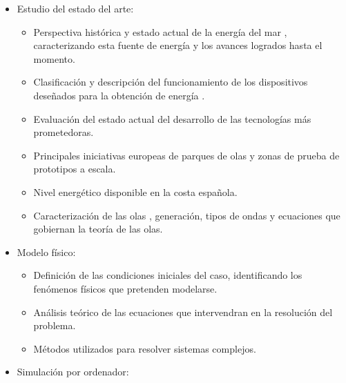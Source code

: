 \begin{itemize}
\item
  Estudio del estado del arte:

  \begin{itemize}
  \item
    Perspectiva histórica y estado actual de la energía del mar
    \citet{montero13}, caracterizando esta fuente de energía y los avances
    logrados hasta el momento.
  \item
    Clasificación y descripción del funcionamiento de los dispositivos
    deseñados para la obtención de energía
    \cite{eduambiental}.
  \item
    Evaluación del estado actual del desarrollo de las tecnologías más
    prometedoras.
  \item
    Principales iniciativas europeas de parques de olas y zonas de
    prueba de prototipos a escala.
  \item
    Nivel energético disponible en la costa española.
  \item
    Caracterización de las olas \cite{pelissero11}, generación, tipos de
    ondas y ecuaciones que gobiernan la teoría de las olas.
  \end{itemize}
\item
  Modelo físico:

  \begin{itemize}
  \item
    Definición de las condiciones iniciales del caso, identificando los
    fenómenos físicos que pretenden modelarse.
  \item
    Análisis teórico de las ecuaciones que intervendran en la resolución
    del problema.
  \item
    Métodos utilizados para resolver sistemas complejos.
  \end{itemize}
\item
  Simulación por ordenador:


\end{itemize}
